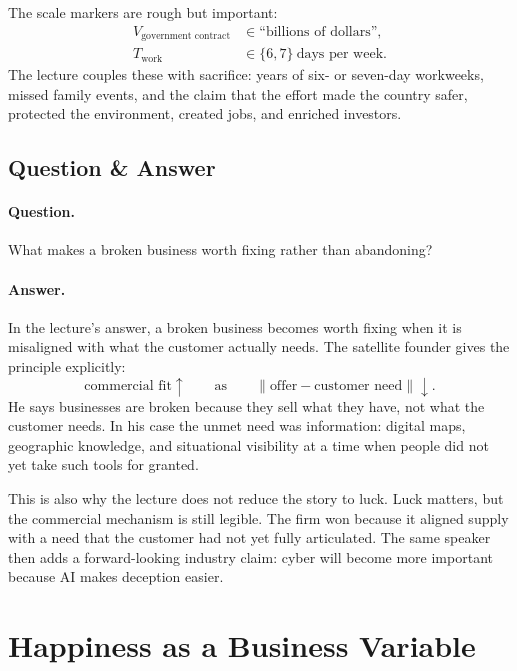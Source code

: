 The scale markers are rough but important:
\begin{align}
V_{\text{government contract}} &\in \text{``billions of dollars''},\\
T_{\text{work}} &\in \{6,7\} \ \text{days per week}.
\end{align}
The lecture couples these with sacrifice: years of six- or seven-day workweeks, missed family events, and the claim that the effort made the country safer, protected the environment, created jobs, and enriched investors.

\subsection{Question \& Answer}

\paragraph{Question.} What makes a broken business worth fixing rather than abandoning?

\paragraph{Answer.} In the lecture's answer, a broken business becomes worth fixing when it is misaligned with what the customer actually needs. The satellite founder gives the principle explicitly:
\begin{equation}
\text{commercial fit} \uparrow
\qquad \text{as} \qquad
\|\text{offer} - \text{customer need}\| \downarrow.
\end{equation}
He says businesses are broken because they sell what they have, not what the customer needs. In his case the unmet need was information: digital maps, geographic knowledge, and situational visibility at a time when people did not yet take such tools for granted.

This is also why the lecture does not reduce the story to luck. Luck matters, but the commercial mechanism is still legible. The firm won because it aligned supply with a need that the customer had not yet fully articulated. The same speaker then adds a forward-looking industry claim: cyber will become more important because AI makes deception easier.

\section{Happiness as a Business Variable}

